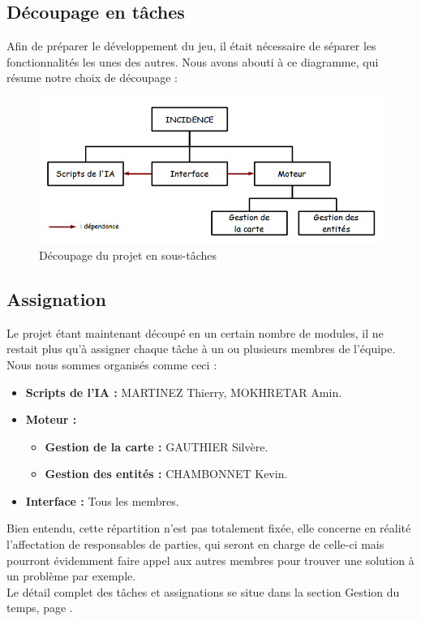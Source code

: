 \documentclass[a4paper]{article}
\newcommand{\alinea}{\hspace*{0.5cm}}
\begin{document}
      \subsection{Découpage en tâches}
        \alinea Afin de préparer le développement du jeu, il était nécessaire de séparer les fonctionnalités les unes des autres. Nous avons abouti à ce diagramme, qui résume notre choix de découpage :
        \begin{figure}
          \begin{center}
            \includegraphics[scale=0.5]{img/DiagrammeDecoupageProjet.png}
          \end{center}
          \label{DiagDecoupage}
          \caption{Découpage du projet en sous-tâches}
        \end{figure}

      \subsection{Assignation}
        \alinea Le projet étant maintenant découpé en un certain nombre de modules, il ne restait plus qu'à assigner chaque tâche à un ou plusieurs membres de l'équipe. Nous nous sommes organisés comme ceci :
        \begin{itemize}
          \item \textbf{Scripts de l'IA :} MARTINEZ Thierry, MOKHRETAR Amin.
          \item \textbf{Moteur :}
          \begin{itemize}
            \item \textbf{Gestion de la carte :} GAUTHIER Silvère.
            \item \textbf{Gestion des entités :} CHAMBONNET Kevin.
          \end{itemize}
          \item \textbf{Interface :} Tous les membres.
        \end{itemize}
        \alinea Bien entendu, cette répartition n'est pas totalement fixée, elle concerne en réalité l'affectation de responsables de parties, qui seront en charge de celle-ci mais pourront évidemment faire appel aux autres membres pour trouver une solution à un problème par exemple.\\
        \alinea Le détail complet des tâches et assignations se situe dans la section Gestion du temps, page \pageref{GestionTps}.
\end{document}
